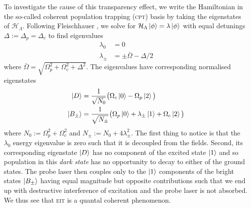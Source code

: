     To investigate the cause of this transparency effect, we write the
    Hamiltonian in the so-called coherent population trapping (\textsc{cpt})
    basis by taking the eigenstates of $\mathcal{H}_\Lambda$. Following
    Fleischhauer \etal\cite{Fleischhauer2005}, we solve for $\mathcal{H}_\Lambda
    \Ket{\phi} = \lambda \Ket{\phi}$ with equal detunings $\Delta := \Delta_p =
    \Delta_c$ to find eigenvalues
    \begin{subequations}
      \begin{align}
      \lambda_0 &= 0 \\
      \lambda_\pm &= \pm \bar{\Omega} -\Delta/2 
      \end{align}
      \label{eqn:lambda_eigvals}
    \end{subequations}
    where $\bar{\Omega}= \sqrt{\Omega_p^2 + \Omega_c^2 + \Delta^2}$. The
    eigenvalues have corresponding normalised eigenstates 
    \begin{subequations}
      \begin{align}
        \Ket{D} &= \frac{1}{\sqrt{N_0}} \big( \Omega_c \Ket{0} - \Omega_p 
        \Ket{2} \big) \\
        \Ket{B_\pm} &= \frac{1}{\sqrt{N_\pm}} \big( \Omega_p \Ket{0} + 
          \lambda_\pm \Ket{1} + \Omega_c \Ket{2} \big)
      \end{align}
      \label{eqn:lambda_eigvects}
    \end{subequations}
    where $N_0 := \Omega_p^2 + \Omega_c^2$ and $N_\pm := N_0 + 4 \lambda_\pm^2$.
    The first thing to notice is that the $\lambda_0$ energy eigenvalue is zero
    such that it is decoupled from the fields. Second, its corresponding
    eigenstate $\Ket{D}$ has no component of the excited state $\Ket{1}$ and so
    population in this \textit{dark state} has no opportunity to decay to either
    of the ground states. The probe laser then couples only to the $\Ket{1}$
    components of the bright states $\Ket{B_\pm}$ having equal magnitude but
    opposite contributions such that we end up with destructive interference of
    excitation and the probe laser is not absorbed. We thus see that
    \textsc{eit} is a quantal coherent phenomenon.

    


